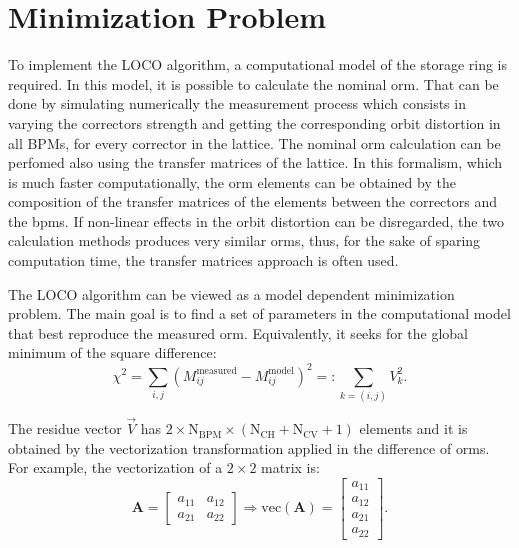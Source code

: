 
\section{Minimization Problem}
To implement the LOCO algorithm, a computational model of the storage ring is required. In this model, it is possible to calculate the nominal \gls{orm}. That can be done by simulating numerically the measurement process which consists in varying the correctors strength and getting the corresponding orbit distortion in all BPMs, for every corrector in the lattice. The nominal \gls{orm} calculation can be perfomed also using the transfer matrices of the lattice. In this formalism, which is much faster computationally, the \gls{orm} elements can be obtained by the composition of the transfer matrices of the elements between the correctors and the \gls{bpm}s. If non-linear effects in the orbit distortion can be disregarded, the two calculation methods produces very similar \gls{orm}s, thus, for the sake of sparing computation time, the transfer matrices approach is often used.

The LOCO algorithm can be viewed as a model dependent minimization problem. The main goal is to find a set of parameters in the computational model that best reproduce the measured \gls{orm}. Equivalently, it seeks for the global minimum of the square difference:
\begin{equation}
    \chi^2 = \sum_{i, j} \left(M^{\mathrm{measured}}_{ij} - M^{\mathrm{model}}_{ij}\right)^2 =: \sum_{{k = (i,j)}} V_{k}^2.
    \label{eq:chi2}
\end{equation}

The residue vector $\vec{V}$ has $2 \times \mathrm{N}_{\mathrm{BPM}} \times \left(\mathrm{N}_{\mathrm{CH}} + \mathrm{N}_{\mathrm{CV}}+1\right)$ elements and it is obtained by the vectorization transformation applied in the difference of \gls{orm}s. For example, the vectorization of a $2 \times 2$ matrix is:
\begin{equation}
        \mathbf{A} = \begin{bmatrix}
     a_{11} & a_{12} \\
     a_{21} & a_{22} 
\end{bmatrix} \Rightarrow \mathrm{vec}\left(\mathbf{A}\right) = \begin{bmatrix}
     a_{11}  \\
     a_{12} \\
     a_{21} \\ 
     a_{22} 
\end{bmatrix}.
\end{equation}

